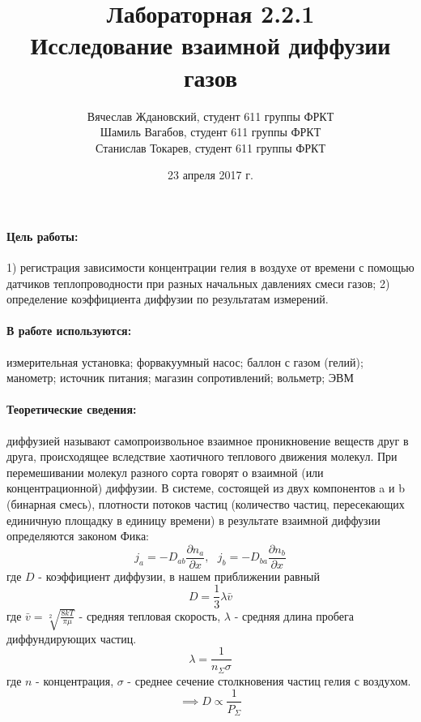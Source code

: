 \documentclass[a4paper]{article}
\title{Лабораторная 2.2.1\\Исследование взаимной диффузии газов}
\date{23 апреля 2017 г.}
\author{Вячеслав Ждановский, студент 611 группы ФРКТ\\
Шамиль Вагабов, студент 611 группы ФРКТ\\
Станислав Токарев, студент 611 группы ФРКТ}
\begin{document}
	\maketitle
	\newpage
	\paragraph{Цель работы:}
	1) регистрация зависимости концентрации гелия в воздухе от времени с помощью датчиков теплопроводности при разных начальных давлениях смеси газов; 2) определение коэффициента диффузии по результатам измерений.
	\paragraph{В работе используются:}
	измерительная установка; форвакуумный насос; баллон с газом (гелий); манометр; источник питания; магазин сопротивлений; вольметр; ЭВМ
	\paragraph{Теоретические сведения:}
диффузией называют самопроизвольное взаимное проникновение веществ друг в друга, происходящее вследствие хаотичного теплового движения молекул. При перемешивании молекул разного сорта говорят о взаимной (или концентрационной) диффузии. В системе, состоящей из двух компонентов a и b (бинарная смесь), плотности потоков частиц (количество частиц, пересекающих единичную площадку в единицу времени) в результате взаимной диффузии определяются законом Фика:
	 \begin{equation}
	j_a = -D_{ab}\frac{\partial n_a}{\partial x}, \text{ } j_b = -D_{ba}\frac{\partial n_b}{\partial x}
	 \end{equation}
	 где $D$ - коэффициент диффузии, в нашем приближении равный
	 \begin{equation}
	 D=\frac{1}{3}\lambda \bar{v}
	 \end{equation}
	 где $\bar{v}=\sqrt[2]{\frac{8kT}{\pi \mu}}$ - средняя тепловая скорость, $\lambda$ - средняя длина пробега диффундирующих частиц.
	 \begin{equation}
	 \lambda=\frac{1}{n_{\Sigma}\sigma}
	 \end{equation}
	 где $n$ - концентрация, $\sigma$ - среднее сечение столкновения частиц гелия с воздухом.
	 \begin{equation}
	 \implies D \propto \frac{1}{P_{\Sigma}}
	 \end{equation}
\end{document}
